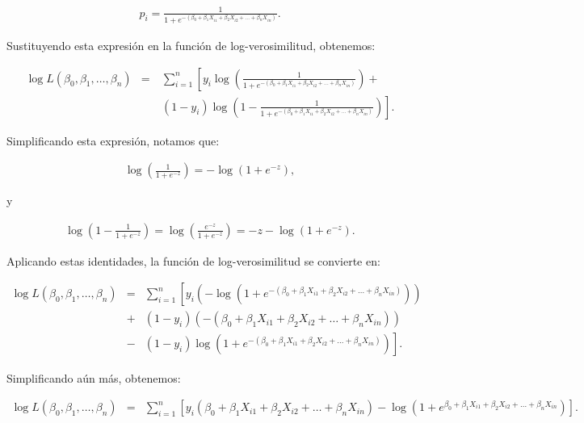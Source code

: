 \documentclass[12pt]{article}
\begin{document}
\begin{eqnarray*}
p_i = \frac{1}{1 + e^{-(\beta_0 + \beta_1 X_{i1} + \beta_2 X_{i2} + \ldots + \beta_n X_{in})}}.
\end{eqnarray*}

Sustituyendo esta expresión en la función de log-verosimilitud, obtenemos:

\begin{eqnarray*}
\log L(\beta_0, \beta_1, \ldots, \beta_n) &=& \sum_{i=1}^{n} \left[ y_i \log \left( \frac{1}{1 + e^{-(\beta_0 + \beta_1 X_{i1} + \beta_2 X_{i2} + \ldots + \beta_n X_{in})}} \right) + \right. \nonumber \\
& \quad& \left. (1 - y_i) \log \left( 1 - \frac{1}{1 + e^{-(\beta_0 + \beta_1 X_{i1} + \beta_2 X_{i2} + \ldots + \beta_n X_{in})}} \right) \right].
\end{eqnarray*}

Simplificando esta expresión, notamos que:

\begin{eqnarray*}
\log \left( \frac{1}{1 + e^{-z}} \right) = -\log(1 + e^{-z}),
\end{eqnarray*}

y

\begin{eqnarray*}
\log \left( 1 - \frac{1}{1 + e^{-z}} \right) = \log \left( \frac{e^{-z}}{1 + e^{-z}} \right) = -z - \log(1 + e^{-z}).
\end{eqnarray*}

Aplicando estas identidades, la función de log-verosimilitud se convierte en:

\begin{eqnarray*}
\log L(\beta_0, \beta_1, \ldots, \beta_n) &=& \sum_{i=1}^{n} \left[ y_i (-\log(1 + e^{-(\beta_0 + \beta_1 X_{i1} + \beta_2 X_{i2} + \ldots + \beta_n X_{in})}))\right.\\
 &+&\left. (1 - y_i) \left( -(\beta_0 + \beta_1 X_{i1} + \beta_2 X_{i2} + \ldots + \beta_n X_{in})\right)\right.\\
 &-& \left.(1 - y_i)\log(1 + e^{-(\beta_0 + \beta_1 X_{i1} + \beta_2 X_{i2} + \ldots + \beta_n X_{in})}) \right].
\end{eqnarray*}

Simplificando aún más, obtenemos:

\begin{eqnarray*}
\log L(\beta_0, \beta_1, \ldots, \beta_n) &=& \sum_{i=1}^{n} \left[ y_i (\beta_0 + \beta_1 X_{i1} + \beta_2 X_{i2} + \ldots + \beta_n X_{in})-\log(1 + e^{\beta_0 + \beta_1 X_{i1} + \beta_2 X_{i2} + \ldots + \beta_n X_{in}}) \right].
\end{eqnarray*}
\end{document}
